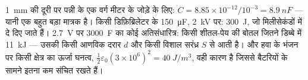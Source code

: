 \begin{example}[तीन संधारित्र और उनकी ऊर्जाएँ]\label{ex:b1:potential-capacitors:energies}
\qty{1}{mm} की दूरी पर पन्नी के एक वर्ग मीटर के जोड़े के लिए: $C = 8.85 \times 10^{-12}/
10^{-3} = \qty{8.9}{nF}$ --- यानी  एक बहुत बड़ा मात्रक है। किसी
डिफ़िब्रिलेटर के \qty{150}{\micro F}, \qty{2}{kV} पर: \qty{300}{J}, जो
मिलीसेकंडों में दे दिए जाते हैं। \qty{2.7}{V} पर \qty{3000}{F} का कोई
अतिसंधारित्र: किसी शीतल-पेय की बोतल जितने डिब्बे में \qty{11}{kJ} ---
उसकी  किसी आणविक दरार $d$ और किसी विशाल सरंध्र $S$ से आती है। और हवा
के भंजन पर किसी क्षेत्र का ऊर्जा घनत्व, $\tfrac12\varepsilon_0(3 \times 10^6)^2 = \qty{40}{J/m^3}$,
वही कारण है जिससे  बैटरियों के सामने इतना कम संचित रखते हैं।
\end{example}

